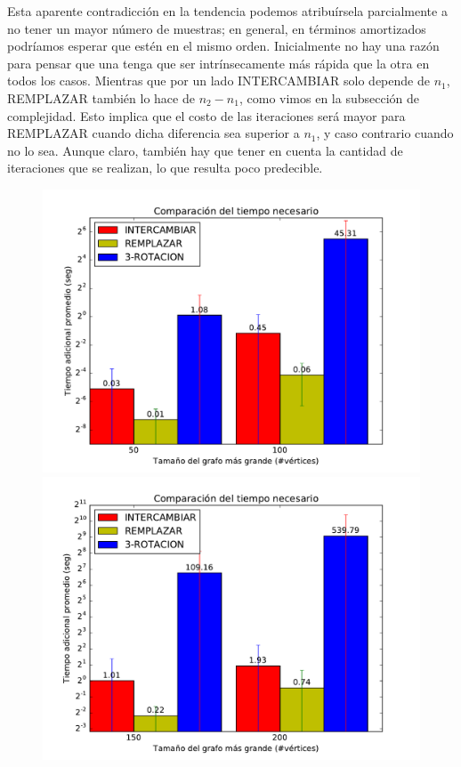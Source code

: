Esta aparente contradicción en la tendencia podemos atribuírsela parcialmente a no tener un mayor número de muestras; en general, en términos amortizados podríamos esperar que estén en el mismo orden. Inicialmente no hay una razón para pensar que una tenga que ser intrínsecamente más rápida que la otra en todos los casos. Mientras que por un lado INTERCAMBIAR solo depende de $n_1$, REMPLAZAR también lo hace de $n_2-n_1$, como vimos en la subsección de complejidad. Esto implica que el costo de las iteraciones será mayor para REMPLAZAR cuando dicha diferencia sea superior a $n_1$, y caso contrario cuando no lo sea. Aunque claro, también hay que tener en cuenta la cantidad de iteraciones que se realizan, lo que resulta poco predecible.  

\begin{figure}[H]
\centering
\begin{minipage}{0.49\textwidth}
  \centering
    \includegraphics[width=1\textwidth]{graficos/problema_5/tiempo0.pdf}
  \caption{}
  \label{fig:5-tiempo1}
\end{minipage}%
\hspace{0.01\textwidth}
\begin{minipage}{0.49\textwidth}   
  \centering
    \includegraphics[width=1\textwidth]{graficos/problema_5/tiempo2.pdf} 
  \caption{}
  \label{fig:5-tiempo2}
\end{minipage}


\end{figure}
